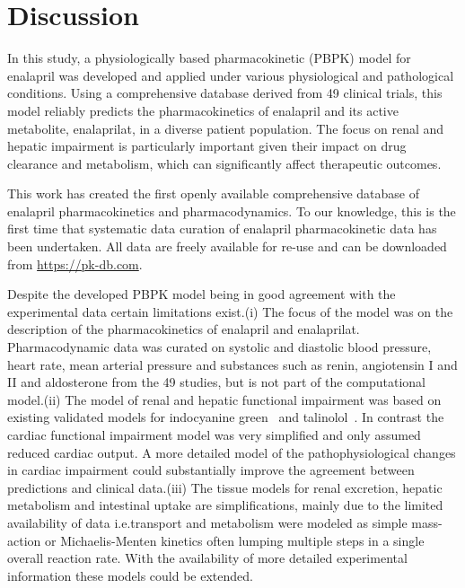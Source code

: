 \documentclass[pharmaceutics,article,submit,pdftex,moreauthors]{Definitions/mdpi}
\begin{document}
\section{Discussion}
In this study, a physiologically based pharmacokinetic (PBPK) model for enalapril was developed and applied under various physiological and pathological conditions. Using a comprehensive database derived from 49 clinical trials, this model reliably predicts the pharmacokinetics of enalapril and its active metabolite, enalaprilat, in a diverse patient population. The focus on renal and hepatic impairment is particularly important given their impact on drug clearance and metabolism, which can significantly affect therapeutic outcomes.

This work has created the first openly available comprehensive database of enalapril pharmacokinetics and pharmacodynamics. To our knowledge, this is the first time that systematic data curation of enalapril pharmacokinetic data has been undertaken. All data are freely available for re-use and can be downloaded from \href{https://pk-db.com}{https://pk-db.com}.

Despite the developed PBPK model being in good agreement with the experimental data certain limitations exist.\@ (i) The focus of the model was on the description of the pharmacokinetics of enalapril and enalaprilat. Pharmacodynamic data was curated on systolic and diastolic blood pressure, heart rate, mean arterial pressure and substances such as renin, angiotensin I and II and aldosterone from the 49 studies, but is not part of the computational model.\@ (ii) The model of renal and hepatic functional impairment was based on existing validated models for indocyanine green~\cite{Koller2021, Koller2021a} and talinolol~\cite{Mallol2023}. In contrast the cardiac functional impairment model was very simplified and only assumed reduced cardiac output. A more detailed model of the pathophysiological changes in cardiac impairment could substantially improve the agreement between predictions and clinical data.\@ (iii) The tissue models for renal excretion, hepatic metabolism and intestinal uptake are simplifications, mainly due to the limited availability of data i.e.\@ transport and metabolism were modeled as simple mass-action or Michaelis-Menten kinetics often lumping multiple steps in a single overall reaction rate. With the availability of more detailed experimental information these models could be extended.
\end{document}
